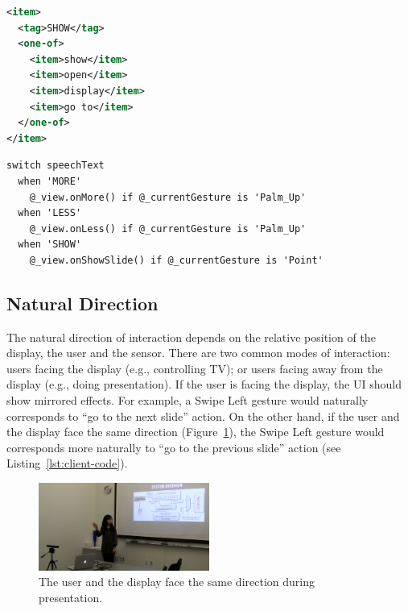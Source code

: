 \begin{lstlisting}[caption={An example of grammar definition in XML.},
language=XML, label={lst:grammar}] 
<item>
  <tag>SHOW</tag>
  <one-of>
    <item>show</item>
    <item>open</item>
    <item>display</item>
    <item>go to</item>
  </one-of>
</item>
\end{lstlisting}

\newpage 

\begin{lstlisting}[caption={Code for speech events in CoffeeScript.},
label={lst:speech-code}] switch speechText
  when 'MORE'
    @_view.onMore() if @_currentGesture is 'Palm_Up'
  when 'LESS'
    @_view.onLess() if @_currentGesture is 'Palm_Up'
  when 'SHOW'
    @_view.onShowSlide() if @_currentGesture is 'Point'
\end{lstlisting}

\subsection{Natural Direction}
The natural direction of interaction depends on the relative position of the
display, the user and the sensor. There are two common modes of interaction:
users facing the display (e.g., controlling TV); or users facing away from the
display (e.g., doing presentation). If the user is facing the display, the UI should show mirrored
effects.
For example, a Swipe Left gesture would naturally corresponds to ``go to the next slide'' action. On the other hand, if
the user and the display face the same direction
(Figure~\ref{fig:presentation}), the Swipe Left gesture would corresponds more
naturally to ``go to the previous slide'' action (see
Listing~\ref{lst:client-code}).

\begin{figure}[tbh]
\centering
\includegraphics[width=0.5\textwidth]{figures/circle1.png}
\caption{The user and the display face the same direction during presentation.}
\label{fig:presentation}
\end{figure}


